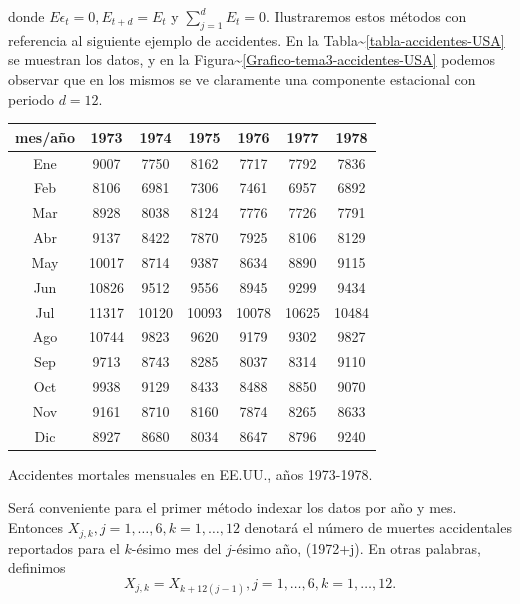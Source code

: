\documentclass[12pt,]{krantz}
\theoremstyle{definition}
\theoremstyle{definition}
\theoremstyle{definition}
\theoremstyle{remark}
\begin{document}
donde \(E\epsilon_t=0, E_{t+d}=E_t\) y \(\sum_{j=1}^dE_t=0\).
Ilustraremos estos métodos con referencia al siguiente ejemplo de
accidentes. En la Tabla\textasciitilde{}\ref{tabla-accidentes-USA} se
muestran los datos, y en la
Figura\textasciitilde{}\ref{Grafico-tema3-accidentes-USA} podemos
observar que en los mismos se ve claramente una componente estacional
con periodo \(d=12\).

\begin{longtable}[]{@{}ccccccc@{}}
\toprule
mes/año & 1973 & 1974 & 1975 & 1976 & 1977 & 1978\tabularnewline
\midrule
\endhead
Ene & 9007 & 7750 & 8162 & 7717 & 7792 & 7836\tabularnewline
Feb & 8106 & 6981 & 7306 & 7461 & 6957 & 6892\tabularnewline
Mar & 8928 & 8038 & 8124 & 7776 & 7726 & 7791\tabularnewline
Abr & 9137 & 8422 & 7870 & 7925 & 8106 & 8129\tabularnewline
May & 10017 & 8714 & 9387 & 8634 & 8890 & 9115\tabularnewline
Jun & 10826 & 9512 & 9556 & 8945 & 9299 & 9434\tabularnewline
Jul & 11317 & 10120 & 10093 & 10078 & 10625 & 10484\tabularnewline
Ago & 10744 & 9823 & 9620 & 9179 & 9302 & 9827\tabularnewline
Sep & 9713 & 8743 & 8285 & 8037 & 8314 & 9110\tabularnewline
Oct & 9938 & 9129 & 8433 & 8488 & 8850 & 9070\tabularnewline
Nov & 9161 & 8710 & 8160 & 7874 & 8265 & 8633\tabularnewline
Dic & 8927 & 8680 & 8034 & 8647 & 8796 & 9240\tabularnewline
\bottomrule
\end{longtable}

Accidentes mortales mensuales en EE.UU., años 1973-1978.

Será conveniente para el primer método indexar los datos por año y mes.
Entonces \(X_{j,k}, j=1,\ldots,6, k=1,\ldots,12\) denotará el número de
muertes accidentales reportados para el \(k\)-ésimo mes del \(j\)-ésimo
año, (1972+j). En otras palabras, definimos
\[X_{j,k}=X_{k+12(j-1)}, j=1,\ldots,6, k=1,\ldots,12.\]
\end{document}
